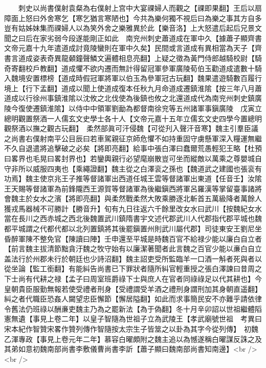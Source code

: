 　　刺史以尚書僕射袁粲為右僕射上宫中大宴祼婦人而觀之【祼即果翻】王后以扇障面上怒曰外舍寒乞【寒乞猶言寒陋也】今共為樂何獨不視后曰為樂之事其方自多豈有姑姊妹集而祼婦人以為笑外舍之樂雅異於此【樂音洛】上大怒遣后起后兄景文聞之曰后在家劣弱今段遂能剛正如此　南兖州刺史蕭道成在軍中久【據蕭子顯齊書文帝元嘉十九年遣道成討竟陵蠻則在軍中久矣】民間或言道成有異相當為天子【齊書言道成姿表奇異龍顙鐘聲鱗文遍體相息亮翻】上疑之徵為黃門侍郎越騎校尉【騎奇寄翻校戶教翻】道成懼不欲内遷而無計得留冠軍參軍廣陵荀伯玉勸道成遣數十騎入魏境安置標榜【道成時假冠軍將軍以伯玉為參軍冠古玩翻】魏果遣遊騎數百履行境上【行下孟翻】道成以聞上使道成復本任秋九月命道成遷鎮淮隂【按三年八月蕭道成以行徐州事鎮淮隂以沈攸之北伐使為後鎮也攸之北還道成代為南兖州刺史鎮廣陵今復使遷鎮淮隂】以侍中中領軍劉勔為都督南徐兖等五州諸軍事鎭廣陵　戊寅立總明觀置祭酒一人儒玄文史學士各十人【文帝元嘉十五年立儒玄文史四學今置總明觀祭酒以撫之觀古玩翻】　柔然部眞可汗侵魏【可從刋入聲汗音寒】魏主引羣臣議之尚書右僕射南平公目辰曰若車駕親征京師危懼不如持重固守虜懸軍深入糧運無繼不久自退遣將追擊破之必矣【將即亮翻】給事中張白澤曰蠢爾荒愚輕犯王略【杜預曰畧界也毛晃曰畧封界也】若鑾輿親行必望麾崩散豈可坐而縱敵以萬乘之尊嬰城自守非所以威服四夷也【乘繩證翻】魏主從之白澤衮之孫也【魏道武之建國也張衮有功焉】魏主使京兆王子推等督諸軍出西道任城王雲等督諸軍出東道【任音壬】汝隂王天賜等督諸軍為前鋒隴西王源賀等督諸軍為後繼鎭西將軍呂羅漢等掌留臺事諸將會魏主於女水之濱【將即亮翻】與柔然戰柔然大敗乘勝逐北斬首五萬級降者萬餘人獲戎馬器械不可勝計【勝音升】旬有九日往返六千餘里改女水曰武川【按魏紀女水當在長川之西赤城之西北後魏置武川鎮隋書宇文述代郡武川人代郡指代郡平城也魏都平城謂之代都代都以北列置鎮將其後罷鎭置州則武川屬代郡】司徒東安王劉尼坐昏醉軍陳不整免官【陳讀曰陣】壬申還至平城是時魏百官不給禄少能以廉白自立者【前言魏主拔清節黜貪汙魏之牧守始有以廉潔著聞者此言魏之百官少能以亷白自立盖法行於州郡未行於朝廷也少詩沼翻】魏主詔吏受所監臨羊一口酒一斛者死與者以從坐論【監工銜翻】有能糾告尚書已下罪狀者隨所糾官輕重授之張白澤諫曰昔周之下士尚有代耕之禄【孟子曰周室班爵祿下士與庶人在官者同祿祿足以代其耕也】今皇朝貴臣服勤無報若使受禮者刑身【受禮謂受羊酒之禮刑身謂刑加其身朝直遥翻】糾之者代職臣恐姦人闚望忠臣懈節【懈居隘翻】如此而求事簡民安不亦難乎請依律令舊法仍班祿以酬亷吏魏主乃為之罷新法【為于偽翻】冬十月辛卯詔以世祖繼體䧟憲無遺【事見上卷二年】以皇子智隨為世祖子立為武陵王【孝武廟號世祖　考異曰宋本紀作智贊宋畧作贊列傳作智隨按太宗生子皆筮之以卦為其字今從列傳】　初魏乙渾專政【事見上卷元年二年】慕容白曜頗附之魏主追以為憾遂稱白曜謀反誅之及其弟如意初魏南部尚書李敷儀曹尚書李訢【蕭子顯曰魏南部尚書知南邊】<br />
<br />
